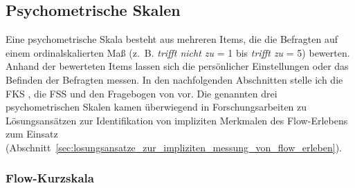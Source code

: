 \subsection{Psychometrische Skalen} 

\label{sub:psychometrische_skalen}

Eine psychometrische Skala besteht aus mehreren Items, die die Befragten auf einem ordinalskalierten Maß (z.~B. \emph{trifft nicht zu} = 1 bis \emph{trifft zu} = 5) bewerten. Anhand der bewerteten Items lassen sich die persönlicher Einstellungen oder das Befinden der Befragten messen. In den nachfolgenden Abschnitten stelle ich die \ac{FKS} \citep{Rheinberg2003}, die \ac{FSS} \citep{Jackson1996} und den Fragebogen von \citet{Keller2008} vor. Die genannten drei psychometrischen Skalen kamen überwiegend in Forschungsarbeiten zu Lösungsansätzen zur Identifikation von impliziten Merkmalen des Flow-Erlebens zum Einsatz (Abschnitt~\ref{sec:losungsansatze_zur_impliziten_messung_von_flow_erleben}).

\subsubsection{Flow-Kurzskala} 

\label{ssub:flow_kurzskala}

